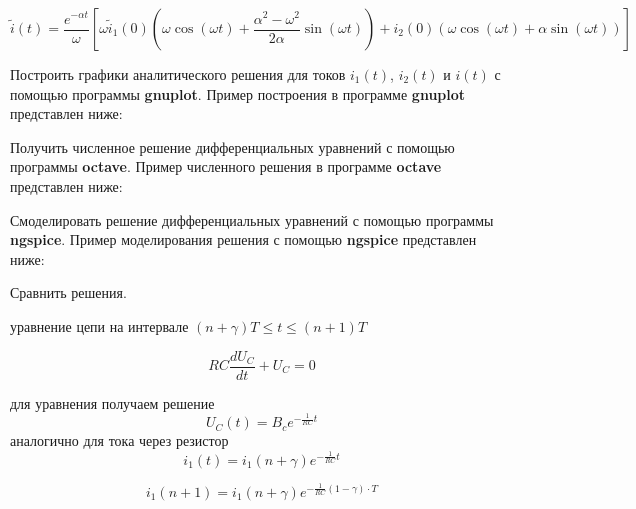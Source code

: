 \documentclass[a4paper,12pt]{article}
\begin{document}
$$
\tilde{i}(t) = \frac{e^{-\alpha t}}{\omega} 
\left[
\omega	\tilde{i}_1(0)\left(\omega\cos(\omega t) + \frac{\alpha^2 - \omega^2}{2\alpha}\sin(\omega t) \right)
+ i_2(0)\left(\omega\cos(\omega t)  + \alpha\sin(\omega t)\right)
\right]
$$



Построить графики аналитического решения для токов $i_1(t)$, $i_2(t)$ и $i(t)$ с помощью программы {\bf gnuplot}. Пример построения в программе {\bf gnuplot}
представлен ниже:



Получить численное решение дифференциальных уравнений с помощью программы {\bf octave}. Пример численного решения в программе {\bf octave} представлен ниже:



Смоделировать решение дифференциальных уравнений с помощью программы {\bf ngspice}. Пример моделирования решения с помощью {\bf ngspice} представлен ниже:



Сравнить решения.


уравнение цепи на интервале $(n+\gamma)T \le t \le (n+1)T$

$$
RC \frac{d U_C}{dt} + U_C = 0
$$


 для уравнения получаем решение
$$
U_C(t) = B_c e^{-\frac{1}{RC}t}
$$
аналогично для тока через резистор
$$
i_1(t) = i_1(n+\gamma) e^{-\frac{1}{RC}t}
$$

$$
i_1(n+1) = i_1(n+\gamma) e^{-\frac{1}{RC}(1-\gamma)\cdot T}
$$
\end{document}
